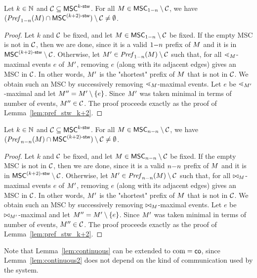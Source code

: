 \documentclass{article}
\begin{document}
\begin{lemma}\label{lem:onen_pref_stw_k+2}
	Let $k \in \mathbb{N}$ and $\mathcal{C} \subseteq \mathsf{MSC}^{k\textup{-}\mathsf{stw}}$. For all
	$M \in \mathsf{MSC}_{1\mathsf{-}n} \setminus \mathcal{C}$, we have
	$(\mathit{Pref}_{1\mathsf{-}n}(M) \cap \mathsf{MSC}^{(k+2)\textup{-}\mathsf{stw}}) \setminus \mathcal{C} \neq \emptyset$.
\end{lemma}
\begin{proof}
	Let $k$ and $\mathcal{C}$ be fixed, and let
	$M\in \mathsf{MSC}_{1\mathsf{-}n} \setminus \mathcal{C}$ be fixed. If the empty MSC is not in $\mathcal{C}$, then we are done, since it is a valid $1\mathsf{-}n$ prefix of $M$ and it is in $\mathsf{MSC}^{(k+2)\textup{-}\mathsf{stw}} \setminus \mathcal{C}$.
	Otherwise, let $M'\in \mathit{Pref}_{1\mathsf{-}n}(M) \setminus \mathcal{C}$ such that, for all $\lessdot_M$-maximal events $e$ of $M'$, removing $e$ (along with its adjacent edges) gives an MSC in $\mathcal{C}$. In other words, $M'$ is the "shortest" prefix of $M$ that is not in $\mathcal{C}$. We obtain such an MSC by successively removing $\lessdot_M$-maximal events. Let $e$ be $\lessdot_{M'}$-maximal and let $M''=M' \setminus \{e\}$. Since $M'$ was taken minimal in terms of number of events,	$M''\in \mathcal{C}$.
	The proof proceeds exactly as the proof of Lemma~\ref{lem:pref_stw_k+2}. 
\end{proof}

\begin{lemma}\label{lem:nn_pref_stw_k+2}
	Let $k \in \mathbb{N}$ and $\mathcal{C} \subseteq \mathsf{MSC}^{k\textup{-}\mathsf{stw}}$. For all
	$M \in \mathsf{MSC}_{n\mathsf{-}n} \setminus \mathcal{C}$, we have
	$(\mathit{Pref}_{n\mathsf{-}n}(M) \cap \mathsf{MSC}^{(k+2)\textup{-}\mathsf{stw}}) \setminus \mathcal{C} \neq \emptyset$.
\end{lemma}
\begin{proof}
	Let $k$ and $\mathcal{C}$ be fixed, and let
	$M\in \mathsf{MSC}_{n\mathsf{-}n} \setminus \mathcal{C}$ be fixed. If the empty MSC is not in $\mathcal{C}$, then we are done, since it is a valid $n\mathsf{-}n$ prefix of $M$ and it is in $\mathsf{MSC}^{(k+2)\textup{-}\mathsf{stw}} \setminus \mathcal{C}$.
	Otherwise, let $M'\in \mathit{Pref}_{n\mathsf{-}n}(M) \setminus \mathcal{C}$ such that, for all $\bowtie_M$-maximal events $e$ of $M'$, removing $e$ (along with its adjacent edges) gives an MSC in $\mathcal{C}$. In other words, $M'$ is the "shortest" prefix of $M$ that is not in $\mathcal{C}$. We obtain such an MSC by successively removing $\bowtie_M$-maximal events. Let $e$ be $\bowtie_{M'}$-maximal and let $M''=M' \setminus \{e\}$. Since $M'$ was taken minimal in terms of number of events,	$M''\in \mathcal{C}$.
	The proof proceeds exactly as the proof of Lemma~\ref{lem:pref_stw_k+2}. 
\end{proof}

Note that Lemma~\ref{lem:continuous} can be extended to $\textup{com} = \mathsf{co}$, since Lemma~\ref{lem:continuous2} does not depend on the kind of communication used by the system. 
\end{document}
